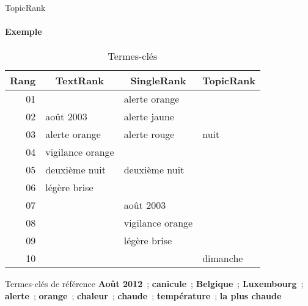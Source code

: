 \begin{frame}{TopicRank}\framesubtitle{Exemple}
  \begin{table}
    \centering
    \begin{tabular}{r|l|l|l}
      \toprule
      \textbf{Rang} & \multicolumn{1}{c|}{\textbf{TextRank}} &
      \multicolumn{1}{c|}{\textbf{SingleRank}} & \multicolumn{1}{c}{\textbf{TopicRank}} \\
      \hline
      01 & \cellcolor{termithgreen!30}{août 2012} & alerte orange & \cellcolor{termithgreen!30}{Luxembourg}\\
      02 & août 2003 & alerte jaune & \cellcolor{termithgreen!30}{alerte} \\
      03 & alerte orange & alerte rouge & nuit \\
      04 & vigilance orange & \cellcolor{termithgreen!30}{alerte} & \cellcolor{termithgreen!30}{Belgique} \\
      05 & deuxième nuit & deuxième nuit & \cellcolor{termithgreen!30}{août 2012}\\
      06 & légère brise & \cellcolor{termithgreen!30}{août 2012} & \cellcolor{termithgreen!30}{chaleur} \\
      07 & & août 2003 & \cellcolor{termithgreen!30}{température} \\
      08 & & vigilance orange & \cellcolor{termithgreen!30}{chaude} \\
      09 & & légère brise & \cellcolor{termithgreen!30}{canicule} \\
      10 & & \cellcolor{termithgreen!30}{Luxembourg} & dimanche \\
      \bottomrule
    \end{tabular}

    \caption{Termes-clés}
  \end{table}

  \begin{exampleblock}{\small Termes-clés de référence}\justifying\small
    \textbf{Août 2012}~; \textbf{canicule}~;
    \textbf{Belgique}~; \textbf{Luxembourg}~; \textbf{alerte}~;
    \textbf{orange}~; \textbf{chaleur}~; \textbf{chaude}~;
    \textbf{température}~; \textbf{la plus chaude}
  \end{exampleblock}
\end{frame}

